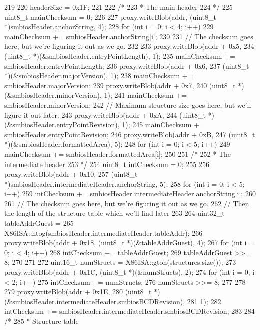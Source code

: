 \begin{DoxyCode}
219 {
220     headerSize = 0x1F;
221 
222     /*
223      * The main header
224      */
225     uint8_t mainChecksum = 0;
226 
227     proxy.writeBlob(addr, (uint8_t *)smbiosHeader.anchorString, 4);
228     for (int i = 0; i < 4; i++)
229         mainChecksum += smbiosHeader.anchorString[i];
230 
231     // The checksum goes here, but we're figuring it out as we go.
232 
233     proxy.writeBlob(addr + 0x5,
234             (uint8_t *)(&smbiosHeader.entryPointLength), 1);
235     mainChecksum += smbiosHeader.entryPointLength;
236     proxy.writeBlob(addr + 0x6,
237             (uint8_t *)(&smbiosHeader.majorVersion), 1);
238     mainChecksum += smbiosHeader.majorVersion;
239     proxy.writeBlob(addr + 0x7,
240             (uint8_t *)(&smbiosHeader.minorVersion), 1);
241     mainChecksum += smbiosHeader.minorVersion;
242     // Maximum structure size goes here, but we'll figure it out later.
243     proxy.writeBlob(addr + 0xA,
244             (uint8_t *)(&smbiosHeader.entryPointRevision), 1);
245     mainChecksum += smbiosHeader.entryPointRevision;
246     proxy.writeBlob(addr + 0xB,
247             (uint8_t *)(&smbiosHeader.formattedArea), 5);
248     for (int i = 0; i < 5; i++)
249         mainChecksum += smbiosHeader.formattedArea[i];
250 
251     /*
252      * The intermediate header
253      */
254     uint8_t intChecksum = 0;
255 
256     proxy.writeBlob(addr + 0x10,
257             (uint8_t *)smbiosHeader.intermediateHeader.anchorString, 5);
258     for (int i = 0; i < 5; i++)
259         intChecksum += smbiosHeader.intermediateHeader.anchorString[i];
260 
261     // The checksum goes here, but we're figuring it out as we go.
262     // Then the length of the structure table which we'll find later
263 
264     uint32_t tableAddrGuest =
265         X86ISA::htog(smbiosHeader.intermediateHeader.tableAddr);
266     proxy.writeBlob(addr + 0x18, (uint8_t *)(&tableAddrGuest), 4);
267     for (int i = 0; i < 4; i++) {
268         intChecksum += tableAddrGuest;
269         tableAddrGuest >>= 8;
270     }
271 
272     uint16_t numStructs = X86ISA::gtoh(structures.size());
273     proxy.writeBlob(addr + 0x1C, (uint8_t *)(&numStructs), 2);
274     for (int i = 0; i < 2; i++) {
275         intChecksum += numStructs;
276         numStructs >>= 8;
277     }
278 
279     proxy.writeBlob(addr + 0x1E,
280             (uint8_t *)(&smbiosHeader.intermediateHeader.smbiosBCDRevision),
281             1);
282     intChecksum += smbiosHeader.intermediateHeader.smbiosBCDRevision;
283 
284     /*
285      * Structure table
}
\end{DoxyCode}
